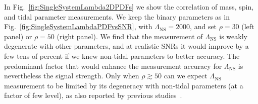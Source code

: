 \documentclass[aps,prd,amsmath,floats,floatfix, twocolumn,
superscriptaddress,nofootinbib,showpacs]{revtex4-1}
\newcommand{\lambdans}{\Lambda_\mathrm{NS}}
\begin{document}
\begin{appendix}





In Fig.~\ref{fig:SingleSystemLambda2DPDFs} we show the correlation of
mass, spin, and tidal parameter measurements. We keep the binary parameters
as in Fig.~\ref{fig:SingleSystemLambdaPDFvsSNR}, with $\lambdans=2000$, and
set $\rho=30$ (left panel) or $\rho=50$ (right panel).
%
We find that the measurement of $\lambdans$ is weakly degenerate with
other parameters, and at realistic SNRs it would improve by a few tens of 
percent if we knew non-tidal parameters to better accuracy. The predominant
factor that would enhance the measurement accuracy for $\lambdans$ is 
nevertheless the signal strength. Only when $\rho\gtrsim 50$ can we
expect $\lambdans$ measurement to be limited by its degeneracy with 
non-tidal parameters (at a factor of few level), as also reported by previous
studies~\cite{Lackey:2013axa}.








\end{appendix}
\end{document}
